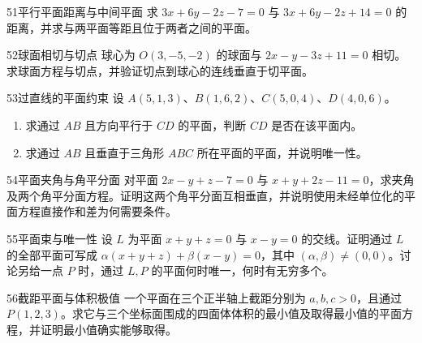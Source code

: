 \begin{exercise}{51}{平行平面距离与中间平面}
求 $3x+6y-2z-7=0$ 与 $3x+6y-2z+14=0$ 的距离，并求与两平面等距且位于两者之间的平面。
\end{exercise}
\begin{exercise}{52}{球面相切与切点}
球心为 $O(3,-5,-2)$ 的球面与 $2x-y-3z+11=0$ 相切。求球面方程与切点，并验证切点到球心的连线垂直于切平面。
\end{exercise}
\begin{exercise}{53}{过直线的平面约束}
设 $A(5,1,3)$、$B(1,6,2)$、$C(5,0,4)$、$D(4,0,6)$。
\begin{enumerate}
\item 求通过 $AB$ 且方向平行于 $CD$ 的平面，判断 $CD$ 是否在该平面内。
\item 求通过 $AB$ 且垂直于三角形 $ABC$ 所在平面的平面，并说明唯一性。
\end{enumerate}
\end{exercise}
\begin{exercise}{54}{平面夹角与角平分面}
对平面 $2x-y+z-7=0$ 与 $x+y+2z-11=0$，求夹角及两个角平分面方程。证明这两个角平分面互相垂直，并说明使用未经单位化的平面方程直接作和差为何需要条件。
\end{exercise}
\begin{exercise}{55}{平面束与唯一性}
设 $L$ 为平面 $x+y+z=0$ 与 $x-y=0$ 的交线。证明通过 $L$ 的全部平面可写成 $\alpha(x+y+z)+\beta(x-y)=0$，其中 $(\alpha,\beta)\ne(0,0)$。讨论另给一点 $P$ 时，通过 $L,P$ 的平面何时唯一，何时有无穷多个。
\end{exercise}
\begin{exercise}{56}{截距平面与体积极值}
一个平面在三个正半轴上截距分别为 $a,b,c>0$，且通过 $P(1,2,3)$。求它与三个坐标面围成的四面体体积的最小值及取得最小值的平面方程，并证明最小值确实能够取得。
\end{exercise}
